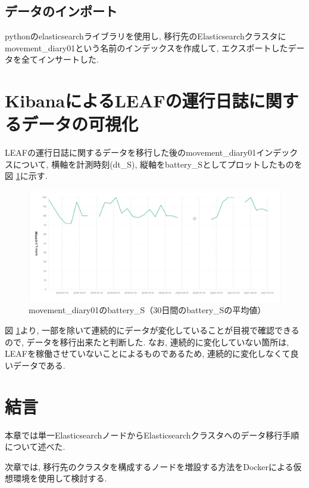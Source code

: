 \subsection{データのインポート}
pythonのelasticsearchライブラリを使用し, 移行先のElasticsearchクラスタにmovement\_diary01という名前のインデックスを作成して, エクスポートしたデータを全てインサートした.

\section{KibanaによるLEAFの運行日誌に関するデータの可視化}

LEAFの運行日誌に関するデータを移行した後のmovement\_diary01インデックスについて, 横軸を計測時刻(dt\_S), 縦軸をbattery\_Sとしてプロットしたものを図 \ref{p15}に示す.

\begin{figure}[H]
  \hspace*{-2cm} %
  \centering %
  \includegraphics[width=170mm]{sotu/figure/battery-s.png}
  \caption{movement\_diary01のbattery\_S（30日間のbattery\_Sの平均値）}
  \label{p15}
\end{figure}

図 \ref{p15}より, 一部を除いて連続的にデータが変化していることが目視で確認できるので, データを移行出来たと判断した. なお, 連続的に変化していない箇所は, LEAFを稼働させていないことによるものであるため, 連続的に変化しなくて良いデータである.

\section{結言}
本章では単一ElasticsearchノードからElasticsearchクラスタへのデータ移行手順について述べた.

次章では, 移行先のクラスタを構成するノードを増設する方法をDockerによる仮想環境を使用して検討する.